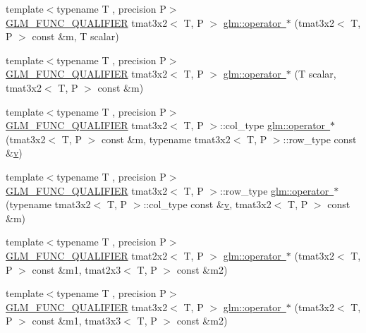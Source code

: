 \begin{DoxyCompactItemize}
\item 
{\footnotesize template$<$typename T , precision P$>$ }\\\mbox{\hyperlink{setup_8hpp_a33fdea6f91c5f834105f7415e2a64407}{G\+L\+M\+\_\+\+F\+U\+N\+C\+\_\+\+Q\+U\+A\+L\+I\+F\+I\+ER}} tmat3x2$<$ T, P $>$ \mbox{\hyperlink{namespaceglm_a103d7650a93d45e2901bb2cbe167f5c7}{glm\+::operator $\ast$}} (tmat3x2$<$ T, P $>$ const \&m, T scalar)
\item 
{\footnotesize template$<$typename T , precision P$>$ }\\\mbox{\hyperlink{setup_8hpp_a33fdea6f91c5f834105f7415e2a64407}{G\+L\+M\+\_\+\+F\+U\+N\+C\+\_\+\+Q\+U\+A\+L\+I\+F\+I\+ER}} tmat3x2$<$ T, P $>$ \mbox{\hyperlink{namespaceglm_ae9cb288a5675139d6b423443be65bed9}{glm\+::operator $\ast$}} (T scalar, tmat3x2$<$ T, P $>$ const \&m)
\item 
{\footnotesize template$<$typename T , precision P$>$ }\\\mbox{\hyperlink{setup_8hpp_a33fdea6f91c5f834105f7415e2a64407}{G\+L\+M\+\_\+\+F\+U\+N\+C\+\_\+\+Q\+U\+A\+L\+I\+F\+I\+ER}} tmat3x2$<$ T, P $>$\+::col\+\_\+type \mbox{\hyperlink{namespaceglm_a5965b847669c65dc19453d904e19c41f}{glm\+::operator $\ast$}} (tmat3x2$<$ T, P $>$ const \&m, typename tmat3x2$<$ T, P $>$\+::row\+\_\+type const \&\mbox{\hyperlink{glad_8h_a14cfbe2fc2234f5504618905b69d1e06}{v}})
\item 
{\footnotesize template$<$typename T , precision P$>$ }\\\mbox{\hyperlink{setup_8hpp_a33fdea6f91c5f834105f7415e2a64407}{G\+L\+M\+\_\+\+F\+U\+N\+C\+\_\+\+Q\+U\+A\+L\+I\+F\+I\+ER}} tmat3x2$<$ T, P $>$\+::row\+\_\+type \mbox{\hyperlink{namespaceglm_a7bdef37fc849d6bef1e936c52ff7f667}{glm\+::operator $\ast$}} (typename tmat3x2$<$ T, P $>$\+::col\+\_\+type const \&\mbox{\hyperlink{glad_8h_a14cfbe2fc2234f5504618905b69d1e06}{v}}, tmat3x2$<$ T, P $>$ const \&m)
\item 
{\footnotesize template$<$typename T , precision P$>$ }\\\mbox{\hyperlink{setup_8hpp_a33fdea6f91c5f834105f7415e2a64407}{G\+L\+M\+\_\+\+F\+U\+N\+C\+\_\+\+Q\+U\+A\+L\+I\+F\+I\+ER}} tmat2x2$<$ T, P $>$ \mbox{\hyperlink{namespaceglm_ad68aab7e1c43657ce70246120c166fef}{glm\+::operator $\ast$}} (tmat3x2$<$ T, P $>$ const \&m1, tmat2x3$<$ T, P $>$ const \&m2)
\item 
{\footnotesize template$<$typename T , precision P$>$ }\\\mbox{\hyperlink{setup_8hpp_a33fdea6f91c5f834105f7415e2a64407}{G\+L\+M\+\_\+\+F\+U\+N\+C\+\_\+\+Q\+U\+A\+L\+I\+F\+I\+ER}} tmat3x2$<$ T, P $>$ \mbox{\hyperlink{namespaceglm_aaef7413e3cee68d6c2a3a47ab6f8c963}{glm\+::operator $\ast$}} (tmat3x2$<$ T, P $>$ const \&m1, tmat3x3$<$ T, P $>$ const \&m2)

\end{DoxyCompactItemize}
